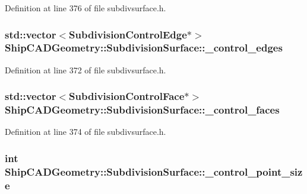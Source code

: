 Definition at line 376 of file subdivsurface.\-h.

\hypertarget{classShipCADGeometry_1_1SubdivisionSurface_a430ba9ceba2a6423a007ea64b4566664}{
\subsubsection[{\-\_\-control\-\_\-edges}]{\setlength{\rightskip}{0pt plus 5cm}std\-::vector$<${\bf Subdivision\-Control\-Edge}$\ast$$>$ Ship\-C\-A\-D\-Geometry\-::\-Subdivision\-Surface\-::\-\_\-control\-\_\-edges\hspace{0.3cm}{\ttfamily [protected]}}}\label{classShipCADGeometry_1_1SubdivisionSurface_a430ba9ceba2a6423a007ea64b4566664}


Definition at line 372 of file subdivsurface.\-h.

\hypertarget{classShipCADGeometry_1_1SubdivisionSurface_a34b2a606532616afdba7a5f71fd9efee}{
\subsubsection[{\-\_\-control\-\_\-faces}]{\setlength{\rightskip}{0pt plus 5cm}std\-::vector$<${\bf Subdivision\-Control\-Face}$\ast$$>$ Ship\-C\-A\-D\-Geometry\-::\-Subdivision\-Surface\-::\-\_\-control\-\_\-faces\hspace{0.3cm}{\ttfamily [protected]}}}\label{classShipCADGeometry_1_1SubdivisionSurface_a34b2a606532616afdba7a5f71fd9efee}


Definition at line 374 of file subdivsurface.\-h.

\hypertarget{classShipCADGeometry_1_1SubdivisionSurface_ae25d19f752c08bb54c821433032ae156}{
\subsubsection[{\-\_\-control\-\_\-point\-\_\-size}]{\setlength{\rightskip}{0pt plus 5cm}int Ship\-C\-A\-D\-Geometry\-::\-Subdivision\-Surface\-::\-\_\-control\-\_\-point\-\_\-size\hspace{0.3cm}{\ttfamily [protected]}}}\label{classShipCADGeometry_1_1SubdivisionSurface_ae25d19f752c08bb54c821433032ae156}


